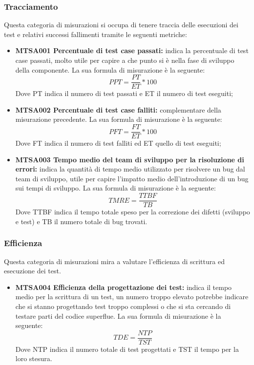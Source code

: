 \documentclass[NormeDiProgetto.tex]{subfiles}
\begin{document}
\subsubsection{Tracciamento}
Questa categoria di misurazioni si occupa di tenere traccia delle esecuzioni dei test e relativi successi fallimenti tramite le seguenti metriche:
\begin{itemize}
	\item \textbf{MTSA001 Percentuale di test case passati:} indica la percentuale di test case passati, molto utile per capire a che punto si è nella fase di sviluppo della componente. La sua formula di misurazione è la seguente:
	\[PPT=\dfrac{PT}{ET}*100\]
	Dove PT indica il numero di test passati e ET il numero di test eseguiti;
	\item \textbf{MTSA002 Percentuale di test case falliti:} complementare della misurazione precedente. La sua formula di misurazione è la seguente:
	\[PFT=\dfrac{FT}{ET}*100\]
	Dove FT indica il numero di test falliti ed ET quello di test eseguiti;
	\item \textbf{MTSA003 Tempo medio del team di sviluppo per la risoluzione di errori:} indica la quantità di tempo medio utilizzato per risolvere un bug dal team di sviluppo, utile per capire l'impatto medio dell'introduzione di un bug sui tempi di sviluppo. La sua formula di misurazione è la seguente:
	\[TMRE=\dfrac{TTBF}{TB}\]
	Dove TTBF indica il tempo totale speso per la correzione dei difetti (sviluppo e test) e TB il numero totale di bug trovati.
\end{itemize}

\subsubsection{Efficienza}
Questa categoria di misurazioni mira a valutare l'efficienza di scrittura ed esecuzione dei test.
\begin{itemize}
	\item \textbf{MTSA004 Efficienza della progettazione dei test:} indica il tempo medio per la scrittura di un test, un numero troppo elevato potrebbe indicare che si stanno progettando test troppo complessi o che si sta cercando di testare parti del codice superflue. La sua formula di misurazione è la seguente:
	\[TDE=\dfrac{NTP}{TST}\]
	Dove NTP indica il numero totale di test progettati e TST il tempo per la loro stesura.
	\begin{comment}
	\item \textlink{MTSA005TAB}{MTSA005}{\textbf{MTSA005 Tempo medio per il testing dei bug fix:}} Indica la quantità di tempo medio per testare la risoluzione di un difetto, utile per avere un'idea dell'impatto del testing sull'implementazione di una modifica
	\[TTCD=\dfrac{BFTT}{NDT}\]
	Dove BFTT indica il tempo usato per testare le la correzione dei difetti e NDT il numero di difetti trovati.
	\end{comment}
\end{itemize}
\end{document}
